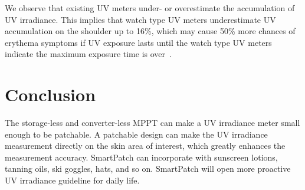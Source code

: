 \documentclass[journal]{IEEEtran}
\begin{document}
We observe that existing UV meters under- or overestimate the accumulation of UV irradiance.
This implies that watch type UV meters underestimate UV accumulation on the shoulder up to 16\%, which may cause 50\% more chances of erythema symptoms if UV exposure lasts until the watch type UV meters indicate the maximum exposure time is over~\cite{Harrison:Method02}.

\section{Conclusion}

The storage-less and converter-less MPPT can make a UV irradiance meter small enough to be patchable.
A patchable design can make the UV irradiance measurement directly on the skin area of interest, which greatly enhances the measurement accuracy.
SmartPatch can incorporate with sunscreen lotions, tanning oils, ski goggles, hats, and so on.
SmartPatch will open more proactive UV irradiance guideline for daily life.








%
%

\end{document}
